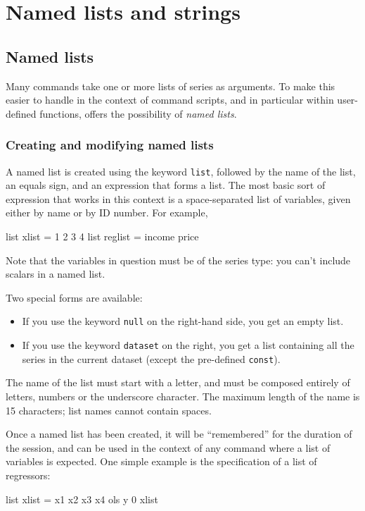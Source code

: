 \chapter{Named lists and strings}
\label{chap-persist}


\section{Named lists}
\label{named-lists}

Many  commands take one or more lists of series as
arguments.  To make this easier to handle in the context of command
scripts, and in particular within user-defined functions, 
offers the possibility of \textit{named lists}.  

\subsection{Creating and modifying named lists}

A named list is created using the keyword \texttt{list}, followed by
the name of the list, an equals sign, and an expression that forms a
list.  The most basic sort of expression that works in this context
is a space-separated list of variables, given either by name or
by ID number.  For example,
%
\begin{code}
list xlist = 1 2 3 4
list reglist = income price 
\end{code}

Note that the variables in question must be of the series type: you
can't include scalars in a named list.

Two special forms are available:
\begin{itemize}
\item If you use the keyword \texttt{null} on the right-hand side,
  you get an empty list.
\item If you use the keyword \texttt{dataset} on the right, you get
  a list containing all the series in the current dataset (except
  the pre-defined \texttt{const}).
\end{itemize}

The name of the list must start with a letter, and must be composed
entirely of letters, numbers or the underscore character.  The maximum
length of the name is 15 characters; list names cannot contain
spaces.  

Once a named list has been created, it will be ``remembered'' for the
duration of the  session, and can be used in the context of
any  command where a list of variables is expected.  One
simple example is the specification of a list of regressors:
%
\begin{code}
list xlist = x1 x2 x3 x4
ols y 0 xlist
\end{code}

